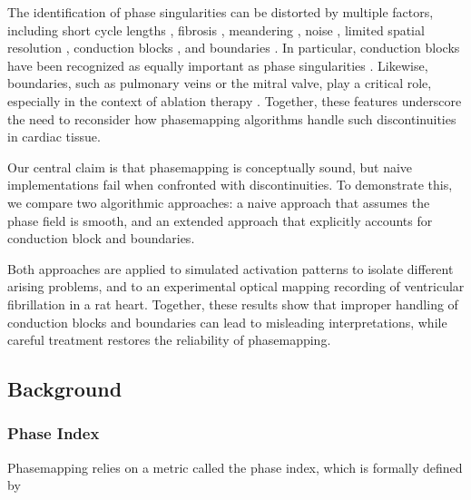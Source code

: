\documentclass[twocolumn]{article}
\begin{document}
The identification of phase singularities can be distorted by multiple factors,
including short cycle lengths \cite{2018simulation_benchmark_wavelength_fibrosis_roney},
fibrosis \cite{2018simulation_benchmark_wavelength_fibrosis_roney, 2024simulation_benchmark_fibrosis_meandering_noise_lootens},
meandering \cite{2024simulation_benchmark_fibrosis_meandering_noise_lootens},
noise \cite{2024simulation_benchmark_fibrosis_meandering_noise_lootens},
limited spatial resolution \cite{2017clinical_benchmark_resolution_roney},
conduction blocks \cite{2025simulation_benchmark_pm_dgm_hhz_lootens},
and boundaries \cite{2025simulation_benchmark_pm_dgm_hhz_lootens}.
In particular, conduction blocks have been recognized as equally important as phase singularities \cite{tomii2021spatial, 2021experimental_phasedefect_method_arno}.
Likewise, boundaries, such as pulmonary veins or the mitral valve, play a critical role,
especially in the context of ablation therapy \cite{duytschaever2024atrial}.
Together, these features underscore the need to reconsider
how phasemapping algorithms handle such discontinuities in cardiac tissue.

Our central claim is that phasemapping is conceptually sound,
but naive implementations fail when confronted with discontinuities.
To demonstrate this, we compare two algorithmic approaches:
a naive approach that assumes the phase field is smooth,
and an extended approach that explicitly accounts for conduction block and boundaries.

Both approaches are applied to simulated activation patterns to isolate different arising problems,
and to an experimental optical mapping recording of ventricular fibrillation in a rat heart.
Together, these results show
that improper handling of conduction blocks and boundaries
can lead to misleading interpretations,
while careful treatment restores the reliability of phasemapping.

\subsection{Background}

\subsubsection{Phase Index}

Phasemapping relies on a metric called the phase index,
which is formally defined by
\end{document}
